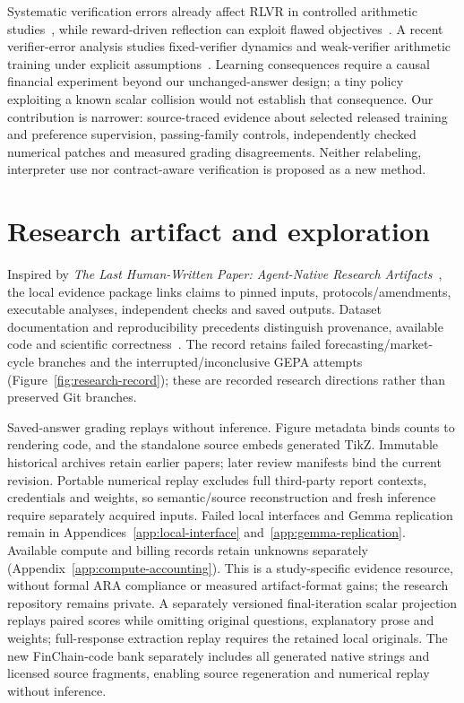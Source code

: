 Systematic verification errors already affect RLVR in controlled arithmetic studies~\cite{verifiernoise}, while reward-driven reflection can exploit flawed objectives~\cite{eposafe}. A recent verifier-error analysis studies fixed-verifier dynamics and weak-verifier arithmetic training under explicit assumptions~\cite{verifiererrors}. Learning consequences require a causal financial experiment beyond our unchanged-answer design; a tiny policy exploiting a known scalar collision would not establish that consequence. Our contribution is narrower: source-traced evidence about selected released training and preference supervision, passing-family controls, independently checked numerical patches and measured grading disagreements. Neither relabeling, interpreter use nor contract-aware verification is proposed as a new method.

\section{Research artifact and exploration}
Inspired by \emph{The Last Human-Written Paper: Agent-Native Research Artifacts}~\cite{ara}, the local evidence package links claims to pinned inputs, protocols/amendments, executable analyses, independent checks and saved outputs. Dataset documentation and reproducibility precedents distinguish provenance, available code and scientific correctness~\cite{datasheets,reproducibility}. The record retains failed forecasting/market-cycle branches and the interrupted/inconclusive GEPA attempts (Figure~\ref{fig:research-record}); these are recorded research directions rather than preserved Git branches.

Saved-answer grading replays without inference. Figure metadata binds counts to rendering code, and the standalone source embeds generated TikZ. Immutable historical archives retain earlier papers; later review manifests bind the current revision. Portable numerical replay excludes full third-party report contexts, credentials and weights, so semantic/source reconstruction and fresh inference require separately acquired inputs. Failed local interfaces and Gemma replication remain in Appendices~\ref{app:local-interface} and~\ref{app:gemma-replication}. Available compute and billing records retain unknowns separately (Appendix~\ref{app:compute-accounting}). This is a study-specific evidence resource, without formal ARA compliance or measured artifact-format gains; the research repository remains private. A separately versioned final-iteration scalar projection replays paired scores while omitting original questions, explanatory prose and weights; full-response extraction replay requires the retained local originals. The new FinChain-code bank separately includes all generated native strings and licensed source fragments, enabling source regeneration and numerical replay without inference.

